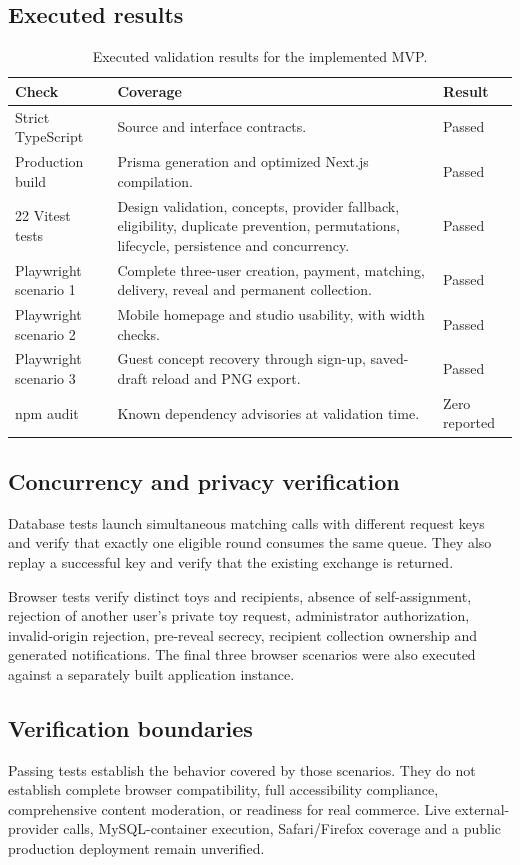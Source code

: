 \documentclass[11pt,a4paper]{article}
\begin{document}
\subsection{Executed results}
\begin{table}[htbp]
\centering\small
\begin{tabularx}{\textwidth}{p{3.8cm}Yp{2cm}}
\toprule\textbf{Check} & \textbf{Coverage} & \textbf{Result}\\
\midrule
Strict TypeScript & Source and interface contracts. & Passed\\
Production build & Prisma generation and optimized Next.js compilation. & Passed\\
22 Vitest tests & Design validation, concepts, provider fallback, eligibility, duplicate prevention, permutations, lifecycle, persistence and concurrency. & Passed\\
Playwright scenario 1 & Complete three-user creation, payment, matching, delivery, reveal and permanent collection. & Passed\\
Playwright scenario 2 & Mobile homepage and studio usability, with width checks. & Passed\\
Playwright scenario 3 & Guest concept recovery through sign-up, saved-draft reload and PNG export. & Passed\\
npm audit & Known dependency advisories at validation time. & Zero reported\\
\bottomrule
\end{tabularx}
\caption{Executed validation results for the implemented MVP.}
\end{table}

\subsection{Concurrency and privacy verification}
Database tests launch simultaneous matching calls with different request keys and verify that exactly one eligible round consumes the same queue. They also replay a successful key and verify that the existing exchange is returned.

Browser tests verify distinct toys and recipients, absence of self-assignment, rejection of another user's private toy request, administrator authorization, invalid-origin rejection, pre-reveal secrecy, recipient collection ownership and generated notifications. The final three browser scenarios were also executed against a separately built application instance.

\subsection{Verification boundaries}
Passing tests establish the behavior covered by those scenarios. They do not establish complete browser compatibility, full accessibility compliance, comprehensive content moderation, or readiness for real commerce. Live external-provider calls, MySQL-container execution, Safari/Firefox coverage and a public production deployment remain unverified.
\end{document}
